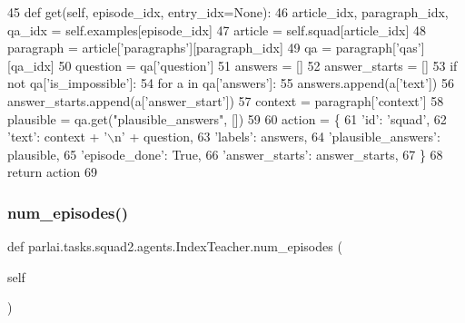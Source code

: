 \begin{DoxyCode}
45     \textcolor{keyword}{def }get(self, episode\_idx, entry\_idx=None):
46         article\_idx, paragraph\_idx, qa\_idx = self.examples[episode\_idx]
47         article = self.squad[article\_idx]
48         paragraph = article[\textcolor{stringliteral}{'paragraphs'}][paragraph\_idx]
49         qa = paragraph[\textcolor{stringliteral}{'qas'}][qa\_idx]
50         question = qa[\textcolor{stringliteral}{'question'}]
51         answers = []
52         answer\_starts = []
53         \textcolor{keywordflow}{if} \textcolor{keywordflow}{not} qa[\textcolor{stringliteral}{'is\_impossible'}]:
54             \textcolor{keywordflow}{for} a \textcolor{keywordflow}{in} qa[\textcolor{stringliteral}{'answers'}]:
55                 answers.append(a[\textcolor{stringliteral}{'text'}])
56                 answer\_starts.append(a[\textcolor{stringliteral}{'answer\_start'}])
57         context = paragraph[\textcolor{stringliteral}{'context'}]
58         plausible = qa.get(\textcolor{stringliteral}{"plausible\_answers"}, [])
59 
60         action = \{
61             \textcolor{stringliteral}{'id'}: \textcolor{stringliteral}{'squad'},
62             \textcolor{stringliteral}{'text'}: context + \textcolor{stringliteral}{'\(\backslash\)n'} + question,
63             \textcolor{stringliteral}{'labels'}: answers,
64             \textcolor{stringliteral}{'plausible\_answers'}: plausible,
65             \textcolor{stringliteral}{'episode\_done'}: \textcolor{keyword}{True},
66             \textcolor{stringliteral}{'answer\_starts'}: answer\_starts,
67         \}
68         \textcolor{keywordflow}{return} action
69 
\end{DoxyCode}
\mbox{\label{classparlai_1_1tasks_1_1squad2_1_1agents_1_1IndexTeacher_aabf2ad3a489d5b1547afa2aaac7b5b79}} 
\subsubsection{\texorpdfstring{num\+\_\+episodes()}{num\_episodes()}}
{\footnotesize\ttfamily def parlai.\+tasks.\+squad2.\+agents.\+Index\+Teacher.\+num\+\_\+episodes (\begin{DoxyParamCaption}\item[{}]{self }\end{DoxyParamCaption})}



